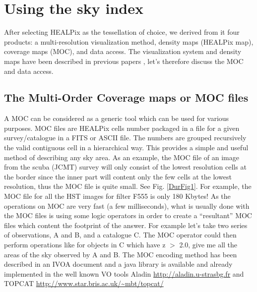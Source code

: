 \section{Using the sky index}
After selecting HEALPix as the tessellation of choice, we derived from it four products: a multi-resolution visualization method, density maps (HEALPix map), coverage maps (MOC), and data access. The visualization system and density maps have been described in previous papers \cite{Fernique}, let's therefore discuss the MOC and data access.

\subsection{The Multi-Order Coverage maps or MOC files}
A MOC can be considered as a generic tool which can be used for various purposes. MOC files are HEALPix cells number packaged in a file for a given survey/catalogue in a FITS or ASCII file. The numbers are grouped recursively the valid contiguous cell in a hierarchical way. This provides a simple and useful method of describing any sky area. 
As an example, the MOC file of an image from the scuba (JCMT) survey
will only consist of the lowest resolution cells at the
border since the inner part will content only the few cells
at the lowest resolution, thus the MOC file is quite small.
See Fig. \ref{DurFig1}.
For example, the MOC file for all the HST images for filter F555 is only 180 Kbytes! As the operations on MOC are very fast (a few milliseconds), what is usually done with the MOC files is using some logic
operators in order to create a ``resultant'' MOC files which
content the footprint of the answer. For example let's take
two series of observations, A and B, and a catalogue
C. The MOC operator could then perform operations like for objects in C which have z $>$ 2.0, give me all the areas of the sky observed by A and B.
The MOC encoding method has been described in an IVOA document and a java library is available and already implemented in the well known VO tools Aladin  \url{http://aladin.u-strasbg.fr} and TOPCAT  \url{http://www.star.bris.ac.uk/~mbt/topcat/}

